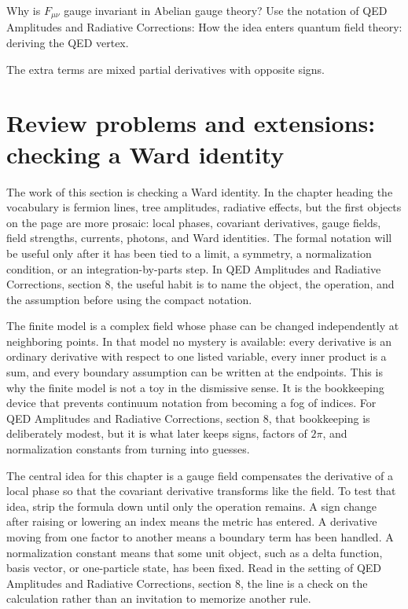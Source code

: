 \begin{exercise}
Why is \(F_{\mu\nu}\) gauge invariant in Abelian gauge theory?  Use the notation of QED Amplitudes and Radiative Corrections: How the idea enters quantum field theory: deriving the QED vertex.
\begin{answer}
The extra terms are mixed partial derivatives with opposite signs.
\end{answer}
\end{exercise}



\section{Review problems and extensions: checking a Ward identity}

The work of this section is checking a Ward identity.  In the chapter heading the vocabulary is fermion lines, tree amplitudes, radiative effects, but the first objects on the page are more prosaic: local phases, covariant derivatives, gauge fields, field strengths, currents, photons, and Ward identities.  The formal notation will be useful only after it has been tied to a limit, a symmetry, a normalization condition, or an integration-by-parts step.  In QED Amplitudes and Radiative Corrections, section 8, the useful habit is to name the object, the operation, and the assumption before using the compact notation.

The finite model is a complex field whose phase can be changed independently at neighboring points.  In that model no mystery is available: every derivative is an ordinary derivative with respect to one listed variable, every inner product is a sum, and every boundary assumption can be written at the endpoints.  This is why the finite model is not a toy in the dismissive sense.  It is the bookkeeping device that prevents continuum notation from becoming a fog of indices.  For QED Amplitudes and Radiative Corrections, section 8, that bookkeeping is deliberately modest, but it is what later keeps signs, factors of \(2\pi\), and normalization constants from turning into guesses.

The central idea for this chapter is a gauge field compensates the derivative of a local phase so that the covariant derivative transforms like the field.  To test that idea, strip the formula down until only the operation remains.  A sign change after raising or lowering an index means the metric has entered.  A derivative moving from one factor to another means a boundary term has been handled.  A normalization constant means that some unit object, such as a delta function, basis vector, or one-particle state, has been fixed.  Read in the setting of QED Amplitudes and Radiative Corrections, section 8, the line is a check on the calculation rather than an invitation to memorize another rule.

